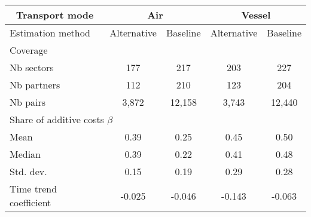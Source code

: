 \begin{tabular}{l|cc|cc}
\cline{1-5}
\multicolumn{1}{c}{Transport mode} &
  \multicolumn{2}{|c|}{Air} &
  \multicolumn{2}{c}{Vessel} \\ \hline
Estimation method &
Alternative &
Baseline &
Alternative &
Baseline \\ \hline
Coverage  \\ \hline
\hspace{1em}Nb sectors &
177 &
217 &
203 &
227 \\
\hspace{1em}Nb partners &
112 &
210 &
123 &
204 \\
\hspace{1em}Nb pairs &
3,872 &
12,158 &
3,743 &
12,440 \\ \hline
\multicolumn{5}{l}{Share of additive costs $\beta$}  \\ \hline
\hspace{1em}Mean &
0.39 &
0.25 &
0.45 &
0.50 \\
\hspace{1em}Median &
0.39 &
0.22 &
0.41 &
0.48 \\
\hspace{1em}Std. dev. &
0.15 &
0.19 &
0.29 &
0.28 \\
\hspace{1em}Time trend coefficient &
-0.025 &
-0.046 &
-0.143 &
-0.063 \\ \hline
\end{tabular}
